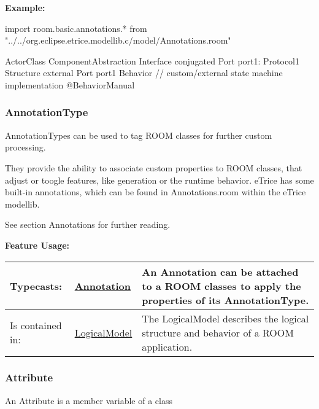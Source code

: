 	\textbf{Example:}
	
		import room.basic.annotations.* from "../../org.eclipse.etrice.modellib.c/model/Annotations.room"
		
		ActorClass ComponentAbstraction {
			Interface {
				conjugated Port port1: Protocol1
			}
			Structure {
				external Port port1
			}
			Behavior {
				// custom/external state machine implementation
				@BehaviorManual
			}
		}
	
	\vspace{\baselineskip}
	\vspace{\baselineskip}
	\vspace{\baselineskip}
	
\subsubsection{AnnotationType}
	\hypertarget{ref:AnnotationType}{}
	AnnotationTypes can be used to tag ROOM classes for further custom processing.
		
	They provide the ability to associate custom properties to ROOM classes, that adjust or toogle features, like generation or the runtime behavior.
	eTrice has some built-in annotations, which can be found in Annotations.room within the eTrice modellib.
	
	See section Annotations for further reading.
		
		
		
	\begingroup
	\textbf{Feature Usage:}
	\renewcommand{\arraystretch}{1.8} %
	\begin{longtable}{l|l p{}}
		\hline
	Typecasts: & \tabitem \hyperlink{ref:Annotation}{Annotation}  & An Annotation can be attached to a ROOM classes to apply the properties of its AnnotationType.\\
	\hline
	Is contained in: & \tabitem \hyperlink{ref:LogicalModel}{LogicalModel}  & The LogicalModel describes the logical structure and behavior of a ROOM application.\\
	\hline
	\end{longtable}
	\endgroup
		
	
	\vspace{\baselineskip}
	\vspace{\baselineskip}
	\vspace{\baselineskip}
	
\subsubsection{Attribute}
	\hypertarget{ref:Attribute}{}
	An Attribute is a member variable of a class
		
